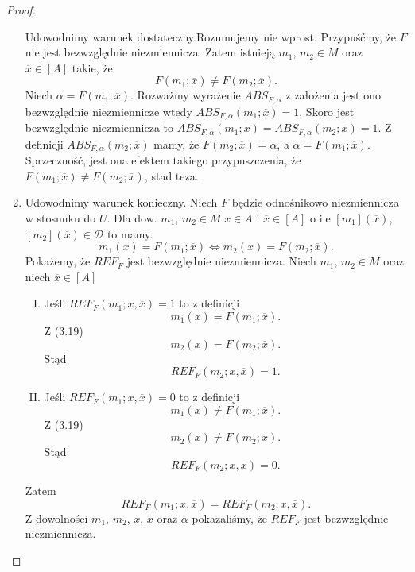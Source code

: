 \documentclass[12pt,a4paper]{report}
\newcommand{\domkniecie}[1]{\left[ {#1} \right] }
\begin{document}
\begin{proof}
\begin{enumerate}
Udowodnimy warunek dostateczny.Rozumujemy nie wprost. Przypuśćmy, że $F$ nie jest bezwzględnie niezmiennicza. Zatem istnieją $m_1$, $m_2 \in M$ oraz $\overline{x} \in \domkniecie{A}$ takie, że
$$
F(m_1;\overline{x})\ne F(m_2;\overline{x}).
$$
Niech $\alpha=F(m_1;\overline{x})$. Rozważmy wyrażenie $ABS_{F,\alpha}$  z założenia jest ono bezwzględnie niezmiennicze wtedy $ABS_{F,\alpha}(m_1;\overline{x})=1$. Skoro jest bezwzględnie niezmiennicza  to $ABS_{F,\alpha}(m_1;\overline{x})=ABS_{F,\alpha}(m_2;\overline{x})=1$. Z definicji $ABS_{F,\alpha}(m_2;\overline{x})$ mamy, że $F(m_2;\overline{x})=\alpha$, a $\alpha=F(m_1;\overline{x})$. Sprzeczność, jest ona efektem takiego przypuszczenia, że $F(m_1;\overline{x})\ne F(m_2;\overline{x})$, stad teza.
\item
Udowodnimy warunek konieczny. Niech $F$ będzie odnośnikowo niezmiennicza w stosunku do $U$. Dla dow. $m_{1}$, $m_{2} \in M$ $x \in A$ i  $\overline{x} \in \domkniecie{A}$ o ile  $\domkniecie{m_1}(\overline{x})$, $\domkniecie{m_2}(\overline{x})\in \mathcal{D}$ to mamy.
\begin{equation}
 m_{1}(x)=F(m_{1};\overline{x}) \iff m_{2}(x)=F(m_{2};\overline{x}).
\end{equation}
Pokażemy, że $REF_{F}$ jest bezwzględnie niezmiennicza. Niech $m_1$, $m_2 \in M$ oraz niech $\overline{x} \in \domkniecie{A}$ 
\begin{enumerate}[I.]
\item
Jeśli $REF_{F}(m_1;x,\overline{x})=1$ to z definicji
$$
m_1(x)=F(m_1;\overline{x}).
$$
Z (3.19) 
$$
m_2(x)=F(m_2;\overline{x}).
$$
Stąd 
$$
REF_{F}(m_2;x,\overline{x})=1.
$$
\item
Jeśli $REF_{F}(m_1;x,\overline{x})=0$ to z definicji 
$$
m_1(x)\ne F(m_1;\overline{x}).
$$
Z (3.19)
$$
m_2(x)\ne F(m_2;\overline{x}).
$$
Stąd
$$
REF_{F}(m_2;x,\overline{x})=0.
$$
\end{enumerate}
Zatem 
$$
REF_{F}(m_1;x,\overline{x})=REF_{F}(m_2;x,\overline{x}).
$$
Z dowolności $m_1$, $m_2$, $\overline{x}$, $x$ oraz $\alpha$ pokazaliśmy, że $REF_{F}$ jest bezwzględnie niezmiennicza.


\end{enumerate}
\end{proof}
\end{document}

